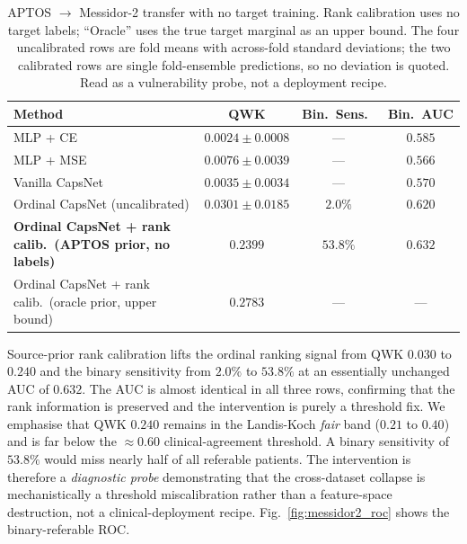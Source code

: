 \documentclass[journal]{IEEEtran}
\begin{document}
\begin{table}[!t]
    \caption{APTOS $\to$ Messidor-2 transfer with no target training. Rank calibration uses no target labels; ``Oracle'' uses the true target marginal as an upper bound. The four uncalibrated rows are fold means with across-fold standard deviations; the two calibrated rows are single fold-ensemble predictions, so no deviation is quoted. Read as a vulnerability probe, not a deployment recipe.}
    \label{tab:cross_messidor2}
    \centering
    \footnotesize
    \begin{tabular}{@{}lccc@{}}
        \toprule
        Method                                                         & QWK                 & Bin.\ Sens.\      & Bin.\ AUC        \\
        \midrule
        MLP + CE                                                       & $0.0024 \pm 0.0008$ & ---               & $0.585$           \\
        MLP + MSE                                                      & $0.0076 \pm 0.0039$ & ---               & $0.566$           \\
        Vanilla CapsNet                                                & $0.0035 \pm 0.0034$ & ---               & $0.570$           \\
        Ordinal CapsNet (uncalibrated)                                 & $0.0301 \pm 0.0185$ & $2.0\%$           & $\mathbf{0.620}$  \\
        \textbf{Ordinal CapsNet + rank calib.\ (APTOS prior, no labels)} & $\mathbf{0.2399}$   & $\mathbf{53.8\%}$ & $0.632$           \\
        Ordinal CapsNet + rank calib.\ (oracle prior, upper bound) & $0.2783$            & ---               & ---               \\
        \bottomrule
    \end{tabular}
\end{table}

Source-prior rank calibration lifts the ordinal ranking signal from QWK $0.030$ to $0.240$ and the binary sensitivity from $2.0\%$ to $53.8\%$ at an essentially unchanged AUC of $0.632$. The AUC is almost identical in all three rows, confirming that the rank information is preserved and the intervention is purely a threshold fix. We emphasise that QWK $0.240$ remains in the Landis-Koch \emph{fair} band ($0.21$ to $0.40$) and is far below the $\approx$0.60 clinical-agreement threshold. A binary sensitivity of $53.8\%$ would miss nearly half of all referable patients. The intervention is therefore a \emph{diagnostic probe} demonstrating that the cross-dataset collapse is mechanistically a threshold miscalibration rather than a feature-space destruction, not a clinical-deployment recipe. Fig.~\ref{fig:messidor2_roc} shows the binary-referable ROC.
\end{document}
